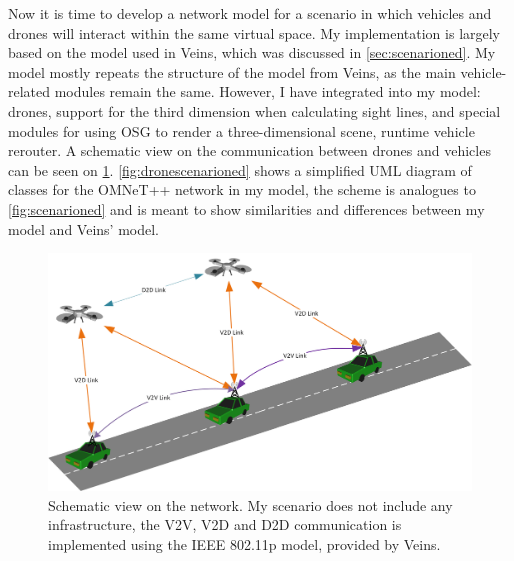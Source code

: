 \documentclass[]{nsm-thesis}
\begin{document}
Now it is time to develop a network model for a scenario in which vehicles and drones will interact within the same virtual space. My implementation is largely based on the model used in Veins, which was discussed in \cref{sec:scenarioned}. My model mostly repeats the structure of the model from Veins, as the main vehicle-related modules remain the same. However, I have integrated into my model: drones, support for the third dimension when calculating sight lines, and special modules for using OSG to render a three-dimensional scene, runtime vehicle rerouter. A schematic view on the communication between drones and vehicles can be seen on \cref{fig:vanetscheme}. \cref{fig:dronescenarioned} shows a simplified UML diagram of classes for the OMNeT++ network in my model, the scheme is analogues to \cref{fig:scenarioned} and is meant to show similarities and differences between my model and Veins' model.

\begin{figure}
	\centering
	\includegraphics[width=1\textwidth]{figures/DAVNScheme.png}
	\caption{Schematic view on the network. My scenario does not include any infrastructure, the \ac{V2V}, \ac{V2D} and \ac{D2D} communication is implemented using the IEEE 802.11p model, provided by Veins.}
	\label{fig:vanetscheme}
\end{figure}
\end{document}

